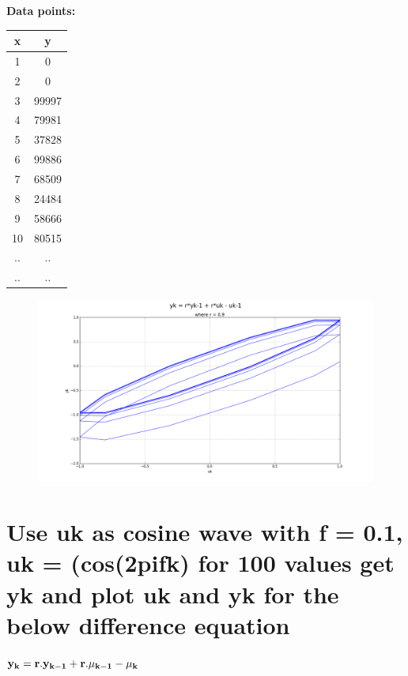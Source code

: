 \documentclass[a4paper,10pt]{article}
\begin{document}
\Large{\bf{Data points:}}\\
\begin{center}
\begin{tabular}[!hbt]{| c | c |}
\hline
\centering
  \bf{x} & \bf{y} \\
  \hline
 1 & 0\\ 
 2 & 0\\  
 3 & 99997 \\
 4 & 79981 \\
 5 & 37828 \\
 6 & 99886 \\
 7 & 68509 \\
 8 & 24484 \\
 9 & 58666 \\
 10 & 80515 \\
 .. & .. \\
 .. & .. \\
 \hline
\end{tabular}
\end{center}

\begin{center}
 \begin{figure}[!hbt]
  \includegraphics[scale=0.33]{figure_1.png}
 \end{figure}
\end{center}

\pagebreak
  \section{Use uk as cosine wave with f = 0.1, uk = (cos(2pifk) for 100 values get yk and  plot uk and yk for the below difference equation}
    $\bf{y_k = r.y_{k-1} + r.\mu_{k-1} - \mu_k}$
    
\end{document}
